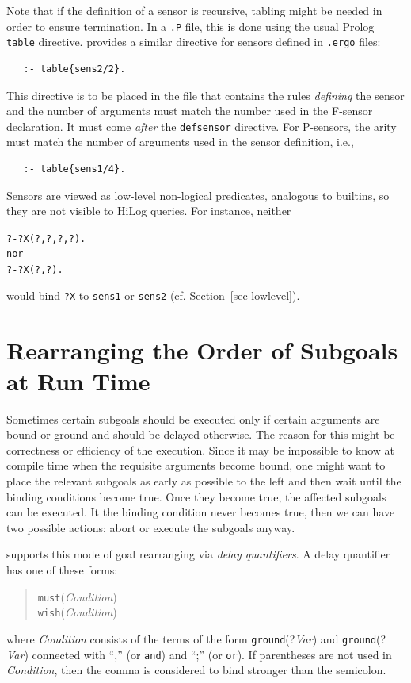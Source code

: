 \documentclass[11pt]{article}
\newcommand{\ERGO}{\mbox{\smaller{\ensuremath{\cal{E}}\smaller{{\sc{RGO}}}}}\xspace}
\newcommand{\FLSYSTEM}{\ERGO}
\newcommand{\ergoext}{ergo\xspace}
\newcommand{\bs}{\textbackslash}
\begin{document}
Note that if the definition of a sensor is recursive, tabling might be
needed in order to ensure termination. In a \texttt{.P} file, this is done
using the usual Prolog \texttt{table} directive. \FLSYSTEM provides a similar
directive for sensors defined in \texttt{.\ergoext} files:
\index{\bs{}table directive}
\begin{verbatim}
   :- table{sens2/2}.
\end{verbatim}
This directive is to be placed in the file that contains the rules \emph{defining}
the sensor and the number of arguments must match the number used in the
F-sensor declaration.
It must come \emph{after} the \texttt{defsensor} directive.  
For P-sensors, the arity must match the number of arguments used in the
sensor definition, i.e.,
\begin{verbatim}
   :- table{sens1/4}.
\end{verbatim}


Sensors are viewed as low-level non-logical predicates, analogous to
builtins, so
they are not visible to HiLog queries. For instance, neither
\begin{alltt}
   ?- ?X(?,?,?,?).
\textnormal{nor}
   ?- ?X(?,?).
\end{alltt}
would bind \texttt{?X}  to \texttt{sens1} or \texttt{sens2}
(cf. Section~\ref{sec-lowlevel}).

  
\section{Rearranging the Order of Subgoals at Run Time}
\label{sec-rearanging}

Sometimes certain subgoals should be executed only if certain arguments are
bound or ground and should be delayed otherwise.
The reason for this might be correctness or efficiency of the execution.
Since it may be impossible to know at compile time when the requisite
arguments become bound, one might want to place the relevant subgoals as
early as possible to the left and then wait until the binding conditions
become true. Once they become true, the affected subgoals can be
executed. It the binding condition never becomes true, then we can have two
possible actions: abort or execute the subgoals anyway.

\FLSYSTEM supports this mode of goal rearranging via \emph{delay quantifiers}.  
A delay quantifier has one of these forms:
\begin{quote}
  \texttt{must}(\emph{Condition})\\
  \texttt{wish}(\emph{Condition})  
\end{quote}
where \emph{Condition} consists of the terms of the form
\texttt{ground}(?\emph{Var}) and \texttt{ground}(?\emph{Var})
connected with ``,'' (or \texttt{and}) and ``;'' (or \texttt{or}).  
If parentheses are not used in \emph{Condition}, then the comma is
considered to bind stronger than the semicolon. 
\end{document}
